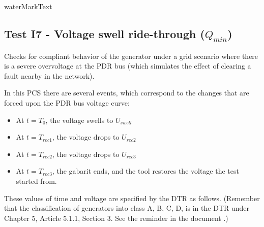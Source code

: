     {{ waterMarkText }}

    \renewcommand{\DTRPcs}{GridVoltageSwell} %
    \renewcommand{\PCSname}{PCS_RTE-I16z3}
    \renewcommand{\OCname}{QMin}


    \subsection{Test I7 - Voltage swell ride-through ($Q_{min}$)}

    Checks for compliant behavior of the generator under a grid scenario where
    there is a severe overvoltage at the PDR bus (which simulates the
    effect of clearing a fault nearby in the network).

    \GridCircuitZthree

    In this PCS there are several events, which correspond to the changes that are
    forced upon the PDR bus voltage curve:
    \begin{itemize}
        \item At $t = T_{0}$, the voltage swells to $U_{swell}$
        \item At $t = T_{rec1}$, the voltage drops to $U_{rec2}$
        \item At $t = T_{rec2}$, the voltage drops to $U_{rec3}$
        \item At $t = T_{rec3}$, the gabarit ends, and the tool restores the
        voltage the test started from.
    \end{itemize}
    These values of time and voltage are specified by the DTR as follows. (Remember
    that the classification of generators into class A, B, C, D, is in the DTR under
    Chapter 5, Article 5.1.1, Section 3. See the reminder in the document
    .)

